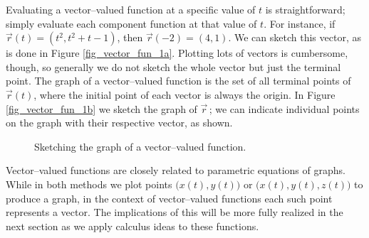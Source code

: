 \fi

Evaluating a vector--valued function at a specific value of $t$ is straightforward; simply evaluate each component function at that value of $t$. For instance, if $\vec r(t) = \left( t^2,t^2+t-1\right)$, then $\vec r(-2) = \left( 4,1\right)$. We can sketch this vector, as is done in Figure \ref{fig_vector_fun_1a}. Plotting lots of vectors is cumbersome, though, so generally we do not sketch the whole vector but just the terminal point. The graph of a vector--valued function is the set of all terminal points of $\vec r(t)$, where the initial point of each vector is always the origin. In Figure \ref{fig_vector_fun_1b} we sketch the graph of $\vec r$\,; we can indicate individual points on the graph with their respective vector, as shown.

\begin{figure}[H]
\centering
\centerline{
\hspace{0.1cm}
}
\caption{Sketching the graph of a vector--valued function. }
\end{figure}

Vector--valued functions are closely related to parametric equations of graphs. While in both methods we plot points $\big(x(t), y(t)\big)$ or $\big(x(t),y(t),z(t)\big)$ to produce a graph, in the context of vector--valued functions each such point represents a vector. The implications of this will be more fully realized in the next section as we apply calculus ideas to these functions.

